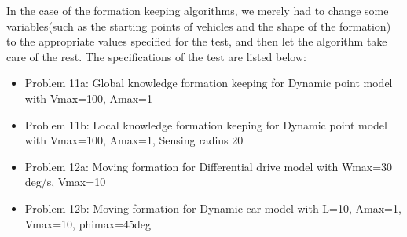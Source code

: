 \documentclass[a4paper,12pt]{article}
\begin{document}
In the case of the formation keeping algorithms, we merely had to change some variables(such as the starting points of vehicles and the shape of the formation) to the appropriate values specified for the test, and then let the algorithm take care of the rest. The specifications of the test are listed below:
\begin{itemize}
\item Problem 11a: Global knowledge formation keeping for Dynamic point model with Vmax=100, Amax=1
\item Problem 11b: Local knowledge formation keeping for Dynamic point model with Vmax=100, Amax=1, Sensing radius 20
\item Problem 12a: Moving formation for Differential drive model with Wmax=30 deg/s, Vmax=10
\item Problem 12b: Moving formation for Dynamic car model with L=10, Amax=1, Vmax=10, phimax=45deg
\end{itemize}
\end{document}

